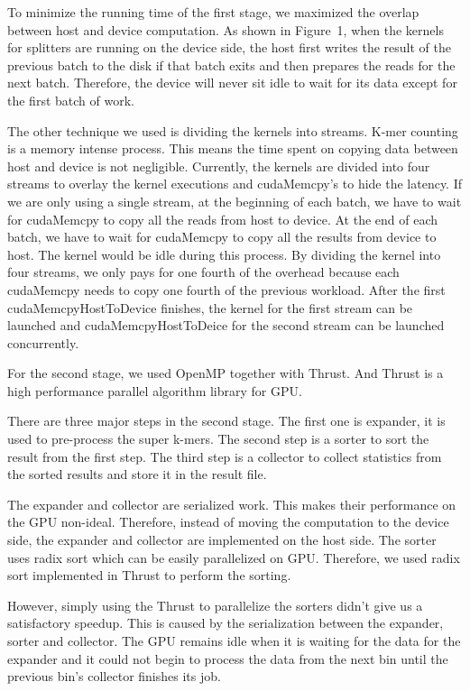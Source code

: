 \documentclass{bioinfo}
\begin{document}
\begin{methods}
To minimize the running time of the first stage, we maximized the overlap between host and device computation. 
As shown in Figure~1\vphantom{\ref{fig:01}}, when the kernels for splitters are running on the device side, the host first writes the result of the previous batch to the disk if that batch exits and then prepares the reads for the next batch.
Therefore, the device will never sit idle to wait for its data except for the first batch of work.

The other technique we used is dividing the kernels into streams. 
K-mer counting is a memory intense process. This means the time spent on copying data between host and device is not negligible.
Currently, the kernels are divided into four streams to overlay the kernel executions and cudaMemcpy's to hide the latency.
If we are only using a single stream, at the beginning of each batch, we have to wait for cudaMemcpy to copy all the reads from host to device.
At the end of each batch, we have to wait for cudaMemcpy to copy all the results from device to host.
The kernel would be idle during this process.
By dividing the kernel into four streams, we only pays for one fourth of the overhead because each cudaMemcpy needs to copy one fourth of the previous workload.    
After the first cudaMemcpyHostToDevice finishes, the kernel for the first stream can be launched and cudaMemcpyHostToDeice for the second stream can be launched concurrently.

For the second stage, we used OpenMP together with Thrust. And Thrust is a high performance parallel algorithm library for GPU.

There are three major steps in the second stage. 
The first one is expander, it is used to pre-process the  super k-mers. The second step is a sorter to sort the result from the first step. The third step is a collector to collect statistics from the sorted results and store it in the result file.

The expander and collector are serialized work. This makes their performance on the GPU non-ideal. 
Therefore, instead of moving the computation to the device side, the expander and collector are implemented on the host side.
The sorter uses radix sort which can be easily parallelized on GPU. 
Therefore, we used radix sort implemented in Thrust to perform the sorting.

However, simply using the Thrust to parallelize the sorters didn't give us a satisfactory speedup.
This is caused by the serialization between the expander, sorter and collector. 
The GPU remains idle when it is waiting for the data for the expander and it could not begin to process the data from the next bin until the previous bin's collector finishes its job.


\end{methods}
\end{document}
